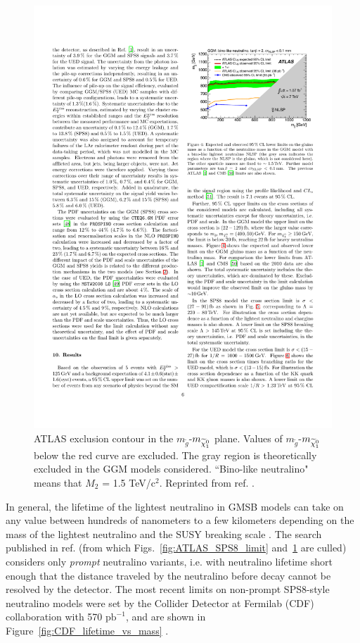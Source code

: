 \documentclass[dissertation.tex]{subfiles}
\begin{document}
\begin{figure}
	\centering
	\includegraphics[scale=0.9]{ATLAS_GGM_limit}
	\caption{ATLAS exclusion contour in the $m_{\widetilde{g}}$-$m_{\widetilde{\chi}_{1}^{0}}$ plane.  Values of $m_{\widetilde{g}}$-$m_{\widetilde{\chi}_{1}^{0}}$ below the red curve are excluded.  The gray region is theoretically excluded in the GGM models considered.  ``Bino-like neutralino" means that $M_{2}$ = 1.5 TeV/$\mbox{c}^{2}$.  Reprinted from ref. \cite{ATLAS_GMSB_1fb-1}.}
	\label{fig:ATLAS_GGM_limit}
\end{figure}

In general, the lifetime of the lightest neutralino in GMSB models can take on any value between hundreds of nanometers to a few kilometers depending on the mass of the lightest neutralino and the SUSY breaking scale \cite{SUSY_primer}.  The search published in ref. \cite{ATLAS_GMSB_1fb-1} (from which Figs.~\ref{fig:ATLAS_SPS8_limit} and~\ref{fig:ATLAS_GGM_limit} are culled) considers only \textit{prompt} neutralino variants, i.e. with neutralino lifetime short enough that the distance traveled by the neutralino before decay cannot be resolved by the detector.  The most recent limits on non-prompt SPS8-style neutralino models were set by the Collider Detector at Fermilab (CDF) collaboration with 570 $\mbox{pb}^{-1}$, and are shown in Figure~\ref{fig:CDF_lifetime_vs_mass} \cite{CDF_2010_GMSB_paper}.
\end{document}
